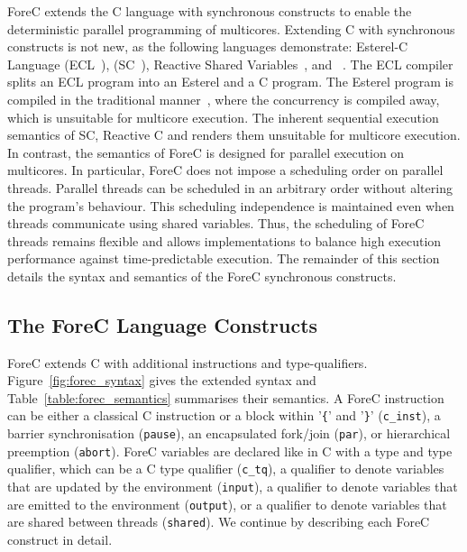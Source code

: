 ForeC extends the C language with synchronous constructs to 
enable the deterministic parallel programming of multicores.
Extending C with synchronous constructs is not new, as the 
following languages demonstrate: Esterel-C Language (ECL~\cite{timed_ecl}), 
\synchronousc{} (SC~\cite{timed_synccharts_c_proposal}), Reactive 
Shared Variables~\cite{timed_reactivec_shared_variables}, 
and \pretc{}~\cite{pret_pretc}. The ECL compiler splits an 
ECL program into an Esterel and a C program. The Esterel program
is compiled in the traditional manner~\cite{timed_compiling_esterel}, 
where the concurrency 
is compiled away, which is unsuitable for multicore execution.
The inherent sequential execution semantics of SC, Reactive C 
and \pretc{} renders them unsuitable for multicore execution. In
contrast, the semantics of ForeC is designed for parallel 
execution on multicores. In particular, ForeC does not impose
a scheduling order on parallel threads. Parallel threads can
be scheduled in an arbitrary order without altering the program's 
behaviour. This scheduling independence is maintained even 
when threads communicate using shared variables. Thus, 
the scheduling of ForeC threads remains flexible and allows 
implementations to balance high execution 
performance against time-predictable execution. The 
remainder of this section details the syntax and semantics 
of the ForeC synchronous constructs.



\subsection{The ForeC Language Constructs}
ForeC extends C with additional instructions and type-qualifiers.
Figure~\ref{fig:forec_syntax} gives the extended syntax and 
Table~\ref{table:forec_semantics} summarises their semantics.  
A ForeC instruction can be either a classical C instruction or
a block within '\verb${$' and '\verb$}$' (\verb$c_inst$), a
barrier synchronisation (\verb$pause$), an encapsulated fork/join
(\verb$par$), or hierarchical preemption (\verb$abort$). ForeC
variables are declared like in C with a type and type qualifier, 
which can be a C type qualifier (\verb$c_tq$), a qualifier to 
denote variables that are updated by the environment (\verb$input$), a 
qualifier to denote variables that are emitted to the
environment (\verb$output$), or a qualifier to denote variables
that are shared between threads (\verb$shared$). We continue by 
describing each ForeC construct in detail.

